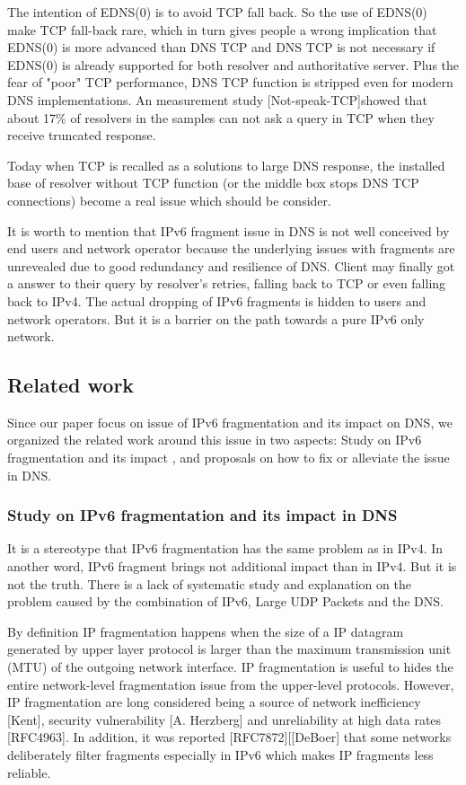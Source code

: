   The intention of EDNS(0) is to avoid TCP fall back.  So the use of
   EDNS(0) make TCP fall-back rare, which in turn gives people a wrong
   implication that EDNS(0) is more advanced than DNS TCP and DNS TCP is
   not necessary if EDNS(0) is already supported for both resolver and
   authoritative server.  Plus the fear of "poor" TCP performance, DNS
   TCP function is stripped even for modern DNS implementations.  An
   measurement study [Not-speak-TCP]showed that about 17\% of resolvers
   in the samples can not ask a query in TCP when they receive truncated
   response.

   Today when TCP is recalled as a solutions to large DNS response, the 
   installed base of resolver without TCP function (or the middle box stops 
   DNS TCP connections) become a real issue which should be consider.


It is worth to mention that IPv6 fragment issue in DNS is not well 
conceived by end users and network operator because the underlying 
issues with fragments are unrevealed due to good redundancy and 
resilience of DNS. Client may finally got a answer to their query 
by resolver's retries, falling back to TCP or even falling back to IPv4. 
The actual dropping of IPv6 fragments is hidden to users and network 
operators. But it is a barrier on the path towards a pure IPv6 only 
network.


\subsection{Related work}
 
Since our paper focus on issue of IPv6 fragmentation and its 
impact on DNS, we organized the related work around this issue 
in two aspects: Study on IPv6 fragmentation and its impact 
, and proposals on how to fix or alleviate the issue in DNS. 

\subsubsection{Study on IPv6 fragmentation and its impact in DNS}

It is a stereotype that IPv6 fragmentation has 
the same problem as in IPv4. In another word, IPv6 fragment brings 
not additional impact than in IPv4. But it is not the truth. 
There is a lack of systematic study and explanation on the 
problem caused by the combination of IPv6, Large UDP Packets 
and the DNS.

By definition IP fragmentation happens when the size of a IP 
datagram generated by upper layer protocol is larger than the 
maximum transmission unit (MTU) of the outgoing network interface.
IP fragmentation is useful to hides the entire network-level 
fragmentation issue from the upper-level protocols. However, IP 
fragmentation are long considered being a source of network 
inefficiency [Kent], security vulnerability [A. Herzberg] and 
unreliability at high data rates [RFC4963]. In addition, it was 
reported [RFC7872][[DeBoer] that some networks deliberately 
filter fragments especially in IPv6 which makes IP fragments 
less reliable. 

